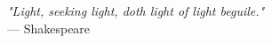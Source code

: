 \begin{flushright}
\emph{"Light, seeking light, doth light of light beguile."}\\
— Shakespeare
\end{flushright}